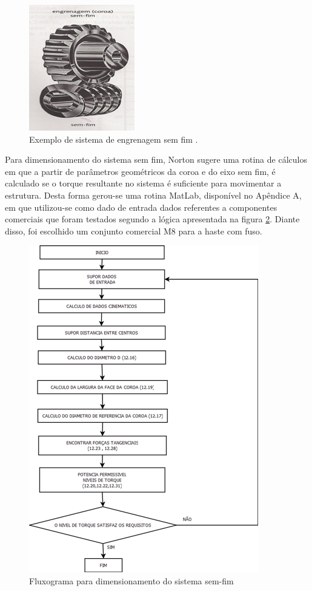 \begin{figure}[H]
		\centering
			\includegraphics[scale=1.0]{figuras/eng.png}
		\caption{Exemplo de sistema de engrenagem sem fim \cite{norton}.}
		\label{eng}
\end{figure}

Para dimensionamento do sistema sem fim, Norton sugere uma rotina de cálculos em que a partir de parâmetros geométricos da coroa e do eixo sem fim, é calculado se o torque resultante no sistema é suficiente para movimentar a estrutura. Desta forma gerou-se uma rotina MatLab, disponível no Apêndice A, em que utilizou-se como dado de entrada dados referentes a componentes comerciais que foram testados segundo a lógica apresentada na figura \ref{fluxdi}. Diante disso, foi escolhido um conjunto comercial M8 para a haste com fuso.

\begin{figure}[htb]
		\centering
			\includegraphics[scale=1.3]{figuras/fluxdi.png}
		\caption{Fluxograma para dimensionamento do sistema sem-fim}
		\label{fluxdi}
\end{figure}

